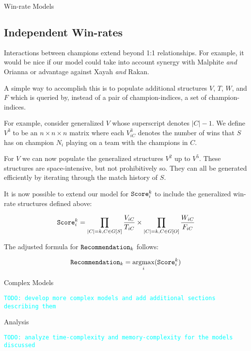 \documentclass[12pt,letterpaper]{article}
\DeclareMathOperator*{\argmax}{argmax}
\newcommand\TODO[1]{\textcolor{cyan}{\lstinline{TODO: #1}}}
\begin{document}
\begin{section}{Win-rate Models}
\subsection{Independent Win-rates}

Interactions between champions extend beyond 1:1 relationships. For example, it
would be nice if our model could take into account synergy with Malphite
\textit{and} Orianna or advantage against Xayah \textit{and} Rakan.
\hfill \vspace{2mm}

A simple way to accomplish this is to populate additional structures $V$, $T$,
$W$, and $F$ which is queried by, instead of a pair of champion-indices, a
set of champion-indices.
\hfill \vspace{2mm}

For example, consider generalized $V$ whose superscript denotes $|C|-1$.
We define $V^{3}$ to be an $n \times n \times n$ matrix where each $V^{3}_{iC}$
denotes the number of wins that $S$ has on champion $N_i$ playing on a team with
the champions in $C$.
\hfill \vspace{2mm}

For $V$ we can now populate the generalized structures $V^2$ up to $V^5$. These
structures are space-intensive, but not prohibitively so. They can all be
generated efficiently by iterating through the match history of $S$.
\hfill \vspace{2mm}

It is now possible to extend our model for $\verb|Score|_{i}^{k}$ to include the
generalized win-rate structures defined above:

\begin{equation}
    \verb|Score|_{i}^{k} =
    \prod_{|C| = k, C \in {G[S]}} { \frac { V_{iC} } { T_{iC} } } \times
    \prod_{|C| = k, C \in {G[O]}} { \frac { W_{iC} } { F_{iC} } }
\end{equation}

The adjusted formula for $\verb|Recommendation|_k$ follows:

\begin{equation}
    \verb|Recommendation|_k = 
    \argmax_i({\verb|Score|_{i}^{k}})
\end{equation}

\end{section}

\begin{section}{Complex Models}

\TODO{develop more complex models and add additional sections describing them}

\end{section}

\begin{section}{Analysis}

\TODO{analyze time-complexity and memory-complexity for the models discussed}

\end{section}

\newpage
\end{document}
